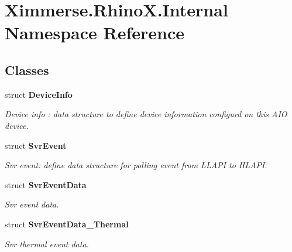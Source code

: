 \hypertarget{namespace_ximmerse_1_1_rhino_x_1_1_internal}{}\section{Ximmerse.\+Rhino\+X.\+Internal Namespace Reference}
\label{namespace_ximmerse_1_1_rhino_x_1_1_internal}
\subsection*{Classes}
\begin{DoxyCompactItemize}
\item 
struct {\bfseries Device\+Info}
\begin{DoxyCompactList}\small\item\em Device info \+: data structure to define device information configurd on this A\+IO device. \end{DoxyCompactList}\item 
struct {\bfseries Svr\+Event}
\begin{DoxyCompactList}\small\item\em Svr event\+: define data structure for polling event from L\+L\+A\+PI to H\+L\+A\+PI. \end{DoxyCompactList}\item 
struct {\bfseries Svr\+Event\+Data}
\begin{DoxyCompactList}\small\item\em Svr event data. \end{DoxyCompactList}\item 
struct {\bfseries Svr\+Event\+Data\+\_\+\+Thermal}
\begin{DoxyCompactList}\small\item\em Svr thermal event data. \end{DoxyCompactList}\end{DoxyCompactItemize}
